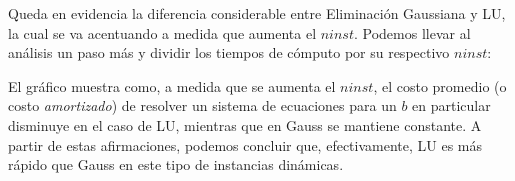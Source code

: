 Queda en evidencia la diferencia considerable entre Eliminación Gaussiana y LU, la cual se va acentuando a medida que aumenta el $ninst$.
Podemos llevar al análisis un paso más y dividir los tiempos de cómputo por su respectivo $ninst$:

\begin{center}

\end{center}

El gráfico muestra como, a medida que se aumenta el $ninst$, el costo promedio (o costo \textit{amortizado}) de resolver un sistema de ecuaciones para un $b$ en particular disminuye en el caso de LU, mientras que en Gauss se mantiene constante.
A partir de estas afirmaciones, podemos concluir que, efectivamente, LU es más rápido que Gauss en este tipo de instancias dinámicas.
